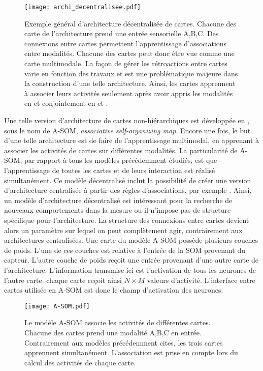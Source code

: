 \documentclass[../main]{subfiles}
\begin{document}
\begin{figure}
    \texttt{[image: archi\_decentralisee.pdf]}
    \caption{Exemple général d'architecture décentralisée de cartes. Chacune des carte de l'architecture prend une entrée sensorielle A,B,C. Des connexions entre cartes permettent l'apprentissage d'associations entre modalités. Chacune des cartes peut donc être vue comme une carte multimodale. La façon de gérer les rétroactions entre cartes varie en fonction des travaux et est une problématique majeure dans la construction d'une telle architecture. Ainsi, les cartes apprennent à associer leurs activités seulement après avoir appris les modalités en \cite{khacef_brain-inspired_2020} et conjointement en \cite{johnsson_associative_2009} et \cite{baheux_towards_2014}.\label{fig:archi_decentralisee}}
\end{figure}

Une telle version d'architecture de cartes non-hiérarchiques est développée en \cite{johnsson_associating_2008,johnsson_associative_2009}, sous le nom de A-SOM, \emph{associative self-organizing map}. Encore une fois, le but d'une telle architecture est de faire de l'apprentissage multimodal, en apprenant à associer les activités de cartes sur différentes modalités. La particularité de A-SOM, par rapport à tous les modèles précédemment étudiés, est que l'apprentissage de toutes les cartes et de leurs interaction est réalisé simultanément. Ce modèle décentralisé inclut la possibilité de créer une version d'architecture centralisée à partir des règles d'associations, par exemple \cite{buonamente_hierarchies_2016}. Ainsi, un modèle d'architecture décentralisé est intéressant pour la recherche de nouveaux comportements dans la mesure ou il n'impose pas de structure spécifique pour l'architecture. La structure des connexions entre cartes devient alors un paramètre sur lequel on peut complètement agir, contrairement aux architectures centralisées.
Une carte du modèle A-SOM possède plusieurs couches de poids. L'une de ces couches est relative à l'entrée de la SOM provenant du capteur. L'autre couche de poids reçoit une entrée provenant d'une autre carte de l'architecture. L'information transmise ici est l'activation de tous les neurones de l'autre carte. chaque carte reçoit ainsi $N\times M$ valeurs d'activité. L'interface entre cartes utilisée en A-SOM est donc le champ d'activation des neurones.

\begin{figure}
    \centering\texttt{[image: A-SOM.pdf]}
    \caption{Le modèle A-SOM \cite{johnsson_associative_2009} associe les activités de différentes cartes. Chacune des cartes prend une modalité A,B,C en entrée. Contrairement aux modèles précédemment cites, les trois cartes apprennent simultanément. L'association est prise en compte lors du calcul des activités de chaque carte.\label{fig:asom}}
\end{figure}
\end{document}
